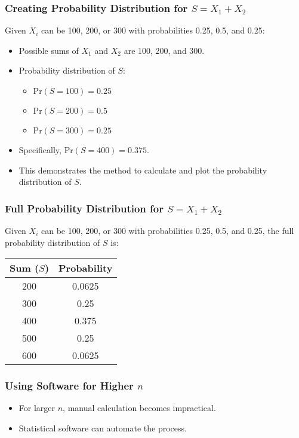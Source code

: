 \documentclass[compress,mathserif]{beamer}
\begin{document}
\begin{frame}
\frametitle{Creating Probability Distribution for \( S = X_1 + X_2 \)}
Given \( X_i \) can be 100, 200, or 300 with probabilities 0.25, 0.5, and 0.25:
\begin{itemize}
    \item Possible sums of \( X_1 \) and \( X_2 \) are 100, 200, and 300.
    \item Probability distribution of \( S \):
    \begin{itemize}
        \item \( \text{Pr}(S = 100) = 0.25 \)
        \item \( \text{Pr}(S = 200) = 0.5 \)
        \item \( \text{Pr}(S = 300) = 0.25 \)
    \end{itemize}
    \item Specifically, \( \text{Pr}(S = 400) = 0.375 \).
    \item This demonstrates the method to calculate and plot the probability distribution of \( S \).
\end{itemize}
\end{frame}

\begin{frame}
\frametitle{Full Probability Distribution for \( S = X_1 + X_2 \)}
Given \( X_i \) can be 100, 200, or 300 with probabilities 0.25, 0.5, and 0.25, the full probability distribution of \( S \) is:
\begin{table}
\centering
\begin{tabular}{cc}
\hline
Sum (\( S \)) & Probability \\
\hline
200 & 0.0625 \\
300 & 0.25 \\
400 & 0.375 \\
500 & 0.25 \\
600 & 0.0625 \\
\hline
\end{tabular}
\end{table}
\end{frame}


\begin{frame}
\frametitle{Using Software for Higher \( n \)}
\begin{itemize}
    \item For larger \( n \), manual calculation becomes impractical.
    \item Statistical software can automate the process.
\end{itemize}
\end{frame}
\end{document}
